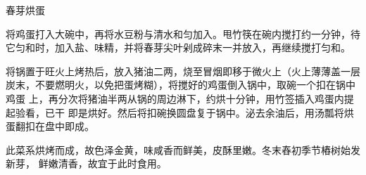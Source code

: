 \begin{recipe}{春芽烘蛋}

\ingredients


\preparation

\step 将鸡蛋打入大碗中，再将水豆粉与清水和匀加入。甩竹筷在碗内搅打约一分钟，待
它匀和时，加入盐、味精，并将春芽尖叶剁成碎末一并放入，再继续搅打匀和。

\step 将锅置于旺火上烤热后，放入猪油二两，烧至冒烟即移于微火上（火上薄薄盖一层
炭末，不要燃明火，以免把蛋烤糊），将搅好的鸡蛋倒入锅中，取碗一个扣在锅中鸡蛋
上，再分次将猪油半两从锅的周边淋下，约烘十分钟，用竹签插入鸡蛋内提起验看，已干
即是烘好。然后将扣碗换圆盘复于锅中。泌去余油后，用汤瓢将烘蛋翻扣在盘中即成。

\features

此菜系烘烤而成，故色泽金黄，味咸香而鲜美，皮酥里嫩。冬末舂初季节樁树始发新芽，
鲜嫩清香，故宜于此时食用。

\end{recipe}

